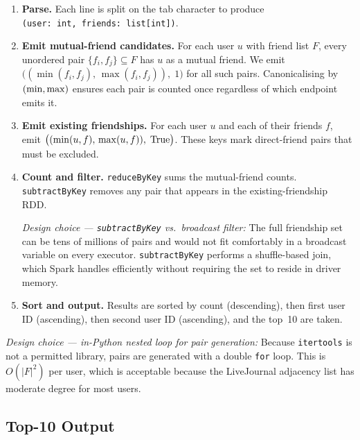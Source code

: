 \documentclass[11pt,a4paper]{article}
\begin{document}
\begin{enumerate}
  \item \textbf{Parse.} Each line is split on the tab character to produce
        \texttt{(user:\ int,\ friends:\ list[int])}.

  \item \textbf{Emit mutual-friend candidates.}
        For each user $u$ with friend list $F$, every unordered pair
        $\{f_i, f_j\} \subseteq F$ has $u$ as a mutual friend.
        We emit $\bigl((\min(f_i,f_j),\,\max(f_i,f_j)),\;1\bigr)$
        for all such pairs.
        Canonicalising by $({\rm min},{\rm max})$ ensures each pair is counted
        once regardless of which endpoint emits it.

  \item \textbf{Emit existing friendships.}
        For each user $u$ and each of their friends $f$, emit
        $\bigl((\min(u,f),\,\max(u,f)),\;{\rm True}\bigr)$.
        These keys mark direct-friend pairs that must be excluded.

  \item \textbf{Count and filter.}
        \texttt{reduceByKey} sums the mutual-friend counts.
        \texttt{subtractByKey} removes any pair that appears in the existing-friendship
        RDD.

        \textit{Design choice — \texttt{subtractByKey} vs.\ broadcast filter:}
        The full friendship set can be tens of millions of pairs and would not fit
        comfortably in a broadcast variable on every executor.
        \texttt{subtractByKey} performs a shuffle-based join, which Spark handles
        efficiently without requiring the set to reside in driver memory.

  \item \textbf{Sort and output.}
        Results are sorted by count (descending), then first user ID (ascending),
        then second user ID (ascending), and the top~10 are taken.
\end{enumerate}

\textit{Design choice — in-Python nested loop for pair generation:}
Because \texttt{itertools} is not a permitted library, pairs are generated with a
double \texttt{for} loop.
This is $O(|F|^2)$ per user, which is acceptable because the LiveJournal adjacency
list has moderate degree for most users.

\subsection*{Top-10 Output}
\end{document}
